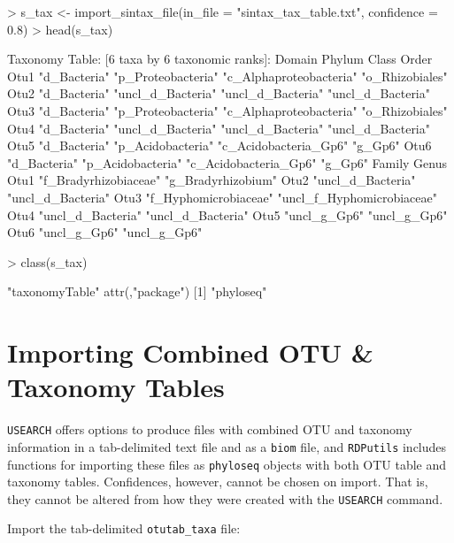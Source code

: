 \documentclass{article}
\begin{document}
\begin{Schunk}
\begin{Sinput}
> s_tax <- import_sintax_file(in_file = "sintax_tax_table.txt", confidence = 0.8)
> head(s_tax)
\end{Sinput}
\begin{Soutput}
Taxonomy Table:     [6 taxa by 6 taxonomic ranks]:
     Domain       Phylum             Class                   Order            
Otu1 "d_Bacteria" "p_Proteobacteria" "c_Alphaproteobacteria" "o_Rhizobiales"  
Otu2 "d_Bacteria" "uncl_d_Bacteria"  "uncl_d_Bacteria"       "uncl_d_Bacteria"
Otu3 "d_Bacteria" "p_Proteobacteria" "c_Alphaproteobacteria" "o_Rhizobiales"  
Otu4 "d_Bacteria" "uncl_d_Bacteria"  "uncl_d_Bacteria"       "uncl_d_Bacteria"
Otu5 "d_Bacteria" "p_Acidobacteria"  "c_Acidobacteria_Gp6"   "g_Gp6"          
Otu6 "d_Bacteria" "p_Acidobacteria"  "c_Acidobacteria_Gp6"   "g_Gp6"          
     Family                Genus                     
Otu1 "f_Bradyrhizobiaceae" "g_Bradyrhizobium"        
Otu2 "uncl_d_Bacteria"     "uncl_d_Bacteria"         
Otu3 "f_Hyphomicrobiaceae" "uncl_f_Hyphomicrobiaceae"
Otu4 "uncl_d_Bacteria"     "uncl_d_Bacteria"         
Otu5 "uncl_g_Gp6"          "uncl_g_Gp6"              
Otu6 "uncl_g_Gp6"          "uncl_g_Gp6"              
\end{Soutput}
\begin{Sinput}
> class(s_tax)
\end{Sinput}
\begin{Soutput}
[1] "taxonomyTable"
attr(,"package")
[1] "phyloseq"
\end{Soutput}
\end{Schunk}

\section*{Importing Combined OTU \& Taxonomy Tables}

\texttt{USEARCH} offers options to produce files with combined OTU and taxonomy information in a tab-delimited text file and as a \texttt{biom} file, and \texttt{RDPutils} includes functions for importing these files as \texttt{phyloseq} objects with both OTU table and taxonomy tables. Confidences, however, cannot be chosen on import. That is, they cannot be altered from how they were created with the \texttt{USEARCH} command.  

Import the tab-delimited \texttt{otutab\_taxa} file:  
\end{document}
